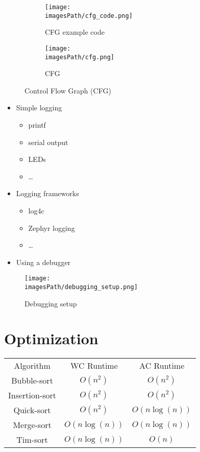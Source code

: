 \begin{figure}[H]
    \centering
    \begin{subfigure}[b]{0.45\textwidth}
        \centering
        \texttt{[image: \\imagesPath/cfg\_code.png]}
        \caption{CFG example code}
    \end{subfigure}
    \hfill
    \begin{subfigure}[b]{0.45\textwidth}
        \centering
        \texttt{[image: \\imagesPath/cfg.png]}
        \caption{CFG}
    \end{subfigure}
       \caption{Control Flow Graph (CFG)}
\end{figure}


\begin{itemize}
    \item Simple logging
    \begin{itemize}
        \item printf
        \item serial output
        \item LEDs
        \item \ldots
    \end{itemize}
    \item Logging frameworks
    \begin{itemize}
        \item log4c
        \item Zephyr logging
        \item \ldots
    \end{itemize}
    \item Using a debugger
\end{itemize}

\begin{figure}[H]
    \centering
    \texttt{[image: \\imagesPath/debugging\_setup.png]}
    \caption{Debugging setup}
\end{figure}


\section{Optimization}
\begin{center}
    \begin{tabular}{ c c c }
     Algorithm      & WC Runtime    & AC Runtime \\ 
     Bubble-sort    & $O(n^2)$      & $O(n^2)$ \\  
     Insertion-sort & $O(n^2)$      & $O(n^2)$ \\  
     Quick-sort     & $O(n^2)$      & $O(n\log(n))$ \\  
     Merge-sort     & $O(n\log(n))$ & $O(n\log(n))$ \\  
     Tim-sort       & $O(n\log(n))$ & $O(n)$ \\  
    \end{tabular}
\end{center}
 

